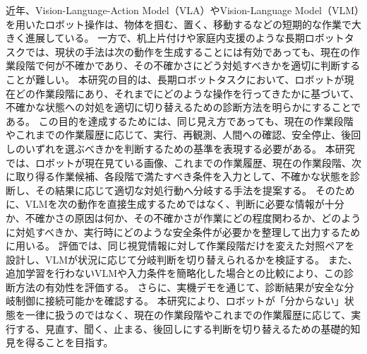 近年、Vision-Language-Action Model（VLA）やVision-Language Model（VLM）を用いたロボット操作は、物体を掴む、置く、移動するなどの短期的な作業で大きく進展している。
一方で、机上片付けや家庭内支援のような長期ロボットタスクでは、現状の手法は次の動作を生成することには有効であっても、現在の作業段階で何が不確かであり、その不確かさにどう対処すべきかを適切に判断することが難しい。
本研究の目的は、長期ロボットタスクにおいて、ロボットが現在どの作業段階にあり、それまでにどのような操作を行ってきたかに基づいて、不確かな状態への対処を適切に切り替えるための診断方法を明らかにすることである。
この目的を達成するためには、同じ見え方であっても、現在の作業段階やこれまでの作業履歴に応じて、実行、再観測、人間への確認、安全停止、後回しのいずれを選ぶべきかを判断するための基準を表現する必要がある。
本研究では、ロボットが現在見ている画像、これまでの作業履歴、現在の作業段階、次に取り得る作業候補、各段階で満たすべき条件を入力として、不確かな状態を診断し、その結果に応じて適切な対処行動へ分岐する手法を提案する。
そのために、VLMを次の動作を直接生成するためではなく、判断に必要な情報が十分か、不確かさの原因は何か、その不確かさが作業にどの程度関わるか、どのように対処すべきか、実行時にどのような安全条件が必要かを整理して出力するために用いる。
評価では、同じ視覚情報に対して作業段階だけを変えた対照ペアを設計し、VLMが状況に応じて分岐判断を切り替えられるかを検証する。
また、追加学習を行わないVLMや入力条件を簡略化した場合との比較により、この診断方法の有効性を評価する。
さらに、実機デモを通じて、診断結果が安全な分岐制御に接続可能かを確認する。
本研究により、ロボットが「分からない」状態を一律に扱うのではなく、現在の作業段階やこれまでの作業履歴に応じて、実行する、見直す、聞く、止まる、後回しにする判断を切り替えるための基礎的知見を得ることを目指す。
